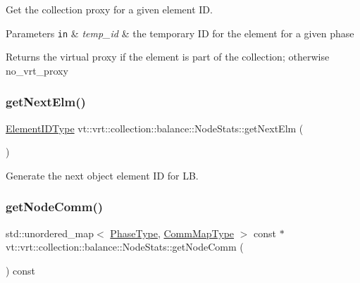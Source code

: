 Get the collection proxy for a given element ID. 


\begin{DoxyParams}[1]{Parameters}
\mbox{\tt in}  & {\em temp\+\_\+id} & the temporary ID for the element for a given phase\\
\hline
\end{DoxyParams}
\begin{DoxyReturn}{Returns}
the virtual proxy if the element is part of the collection; otherwise {\ttfamily no\+\_\+vrt\+\_\+proxy} 
\end{DoxyReturn}
\mbox{\label{structvt_1_1vrt_1_1collection_1_1balance_1_1_node_stats_ac1b800713117d8f017746985a66dfbd2}} 
\subsubsection{\texorpdfstring{get\+Next\+Elm()}{getNextElm()}}
{\footnotesize\ttfamily \hyperlink{namespacevt_1_1vrt_1_1collection_1_1balance_a14c8d2c972f2913aa3f1636e5be0a120}{Element\+I\+D\+Type} vt\+::vrt\+::collection\+::balance\+::\+Node\+Stats\+::get\+Next\+Elm (\begin{DoxyParamCaption}{ }\end{DoxyParamCaption})}



Generate the next object element ID for LB. 

\mbox{\label{structvt_1_1vrt_1_1collection_1_1balance_1_1_node_stats_a236c9f6b9ba7446a35cbc1052949d558}} 
\subsubsection{\texorpdfstring{get\+Node\+Comm()}{getNodeComm()}}
{\footnotesize\ttfamily std\+::unordered\+\_\+map$<$ \hyperlink{namespacevt_a46ce6733d5cdbd735d561b7b4029f6d7}{Phase\+Type}, \hyperlink{namespacevt_1_1vrt_1_1collection_1_1balance_a10860c956804d644db54a16012352728}{Comm\+Map\+Type} $>$ const  $\ast$ vt\+::vrt\+::collection\+::balance\+::\+Node\+Stats\+::get\+Node\+Comm (\begin{DoxyParamCaption}{ }\end{DoxyParamCaption}) const}



